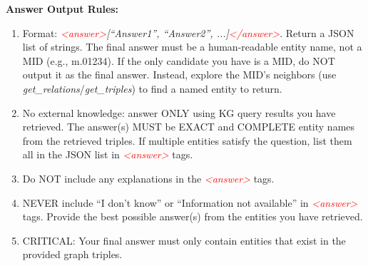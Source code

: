 \begin{tcolorbox}
\textbf{Answer Output Rules:}
\begin{enumerate}
  \item Format: \textcolor{red}{\textit{<answer>}}\textit{[``Answer1'', ``Answer2'', ...]}\textcolor{red}{\textit{</answer>}}. Return a JSON list of strings. The final answer must be a human-readable entity name, not a MID (e.g., m.01234). If the only candidate you have is a MID, do NOT output it as the final answer. Instead, explore the MID's neighbors (use \textit{get\_relations}/\textit{get\_triples}) to find a named entity to return.
  \item No external knowledge: answer ONLY using KG query results you have retrieved. The answer(s) MUST be EXACT and COMPLETE entity names from the retrieved triples. If multiple entities satisfy the question, list them all in the JSON list in \textcolor{red}{\textit{<answer>}} tags.
  \item Do NOT include any explanations in the \textcolor{red}{\textit{<answer>}} tags.
  \item NEVER include ``I don't know'' or ``Information not available'' in \textcolor{red}{\textit{<answer>}} tags. Provide the best possible answer(s) from the entities you have retrieved.
  \item CRITICAL: Your final answer must only contain entities that exist in the provided graph triples.
\end{enumerate}
\end{tcolorbox}



